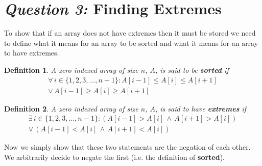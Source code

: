 \documentclass[12pt]{article}
\newtheorem*{definition}{Definition}
\begin{document}






\section{\textit{Question 3:} Finding Extremes}

To show that if an array does not have extremes then it must be
stored we need to define what it means for an array to be sorted
and what it means for an array to have extremes.

\begin{definition}
  A zero indexed array of size $n$, $A$, is said to be
  \textbf{sorted} if
  \begin{align*}
    \forall \, i \in \{1,2,3,\ldots,n-1\} :
    A[i-1] \leq A[i] \leq A[i+1] \\
    \vee \,
    A[i-1] \geq A[i] \geq A[i+1]
  \end{align*}
\end{definition}

\begin{definition}
  A zero indexed array of size $n$, $A$, is said to have
  \textbf{extremes} if
  \begin{align*}
    \exists \, i \in \{1,2,3,\ldots,n-1\} :
    (A[i-1] > A[i] \, \wedge \, A[i+1] > A[i]) \\ 
    \vee \,
    (A[i-1] < A[i] \, \wedge \, A[i+1] < A[i])
  \end{align*}
\end{definition}

Now we simply show that these two statements are the negation of
each other. We arbitrarily decide to negate the first (i.e. the
definition of \textbf{sorted}).
\end{document}
